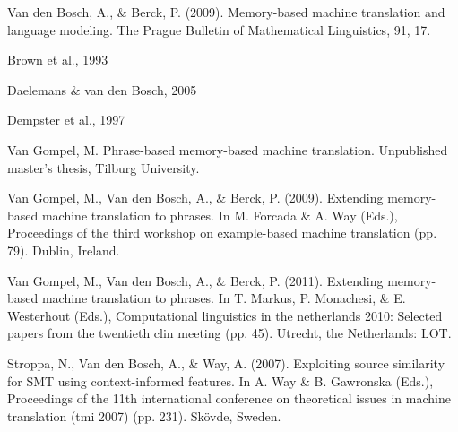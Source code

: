 \documentclass[12pt]{article}
\begin{document}
\begin{thebibliography}{99}

Van den Bosch, A., \& Berck, P. (2009). Memory-based machine translation and language
modeling. The Prague Bulletin of Mathematical Linguistics, 91, 17.

Brown et al., 1993

Daelemans \& van den Bosch, 2005

Dempster et al., 1997

Van Gompel, M. Phrase-based memory-based machine translation. Unpublished
master's thesis, Tilburg University.

Van Gompel, M., Van den Bosch, A., \& Berck, P. (2009). Extending memory-based
machine translation to phrases. In M. Forcada \& A. Way (Eds.), Proceedings of the
third workshop on example-based machine translation (pp. 79). Dublin, Ireland.

Van Gompel, M., Van den Bosch, A., \& Berck, P. (2011). Extending memory-based
machine translation to phrases. In T. Markus, P. Monachesi, \& E. Westerhout (Eds.),
Computational linguistics in the netherlands 2010: Selected papers from the twentieth
clin meeting (pp. 45). Utrecht, the Netherlands: LOT.

Stroppa, N., Van den Bosch, A., \& Way, A. (2007). Exploiting source similarity for SMT
using context-informed features. In A. Way \& B. Gawronska (Eds.), Proceedings of the
11th international conference on theoretical issues in machine translation (tmi 2007)
(pp. 231). Skövde, Sweden.

\end{thebibliography}
\end{document}
